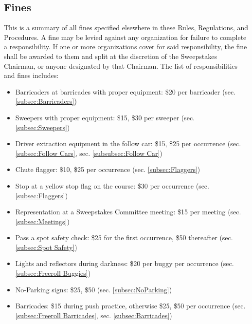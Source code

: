 \begin{appendices}
	\section{Fines}
		This is a summary of all fines specified elsewhere in these Rules, Regulations, 
		and Procedures. A fine may be levied against any organization for failure to complete
		a responsibility. If one or more organizations cover for said responsibility, the fine
		shall be awarded to them and split at the discretion of the Sweepstakes Chairman, or 
		anyone designated by that Chairman. The list of responsibilities and fines includes:

		\begin{itemize}

			\item Barricaders at barricades with proper equipment: \$20 per barricader (sec. \ref{subsec:Barricaders})
			
			\item Sweepers with proper equipment: \$15, \$30 per sweeper (sec. \ref{subsec:Sweepers})
			
			\item Driver extraction equipment in the follow car: \$15, \$25 per occurrence (sec. \ref{subsec:Follow Cars}, sec. \ref{subsubsec:Follow Car})
			
			\item Chute flagger: \$10, \$25 per occurrence (sec. \ref{subsec:Flaggers})
			
			\item Stop at a yellow stop flag on the course: \$30 per occurrence (sec. \ref{subsec:Flaggers})

			\item Representation at a Sweepstakes Committee meeting: \$15 per meeting (sec. \ref{subsec:Meetings})

			\item Pass a spot safety check: \$25 for the first occurrence, \$50 thereafter (sec. \ref{subsec:Spot Safety})
			
			\item Lights and reflectors during darkness: \$20 per buggy per occurrence (sec. \ref{subsec:Freeroll Buggies})

			\item No-Parking signs: \$25, \$50 (sec. \ref{subsec:NoParking})
			
			\item Barricades: \$15 during push practice, otherwise \$25, \$50 per occurrence (sec. \ref{subsec:Freeroll Barricades}, sec. \ref{subsec:Barricades})


\end{itemize}
\end{appendices}
